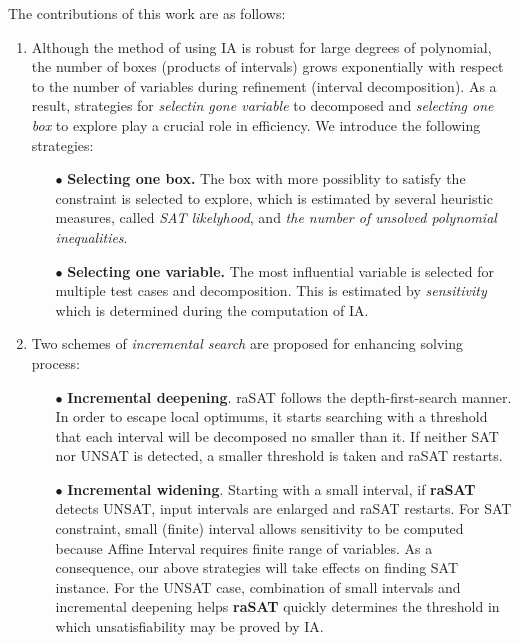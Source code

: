 The contributions of this work are as follows:
\begin{enumerate}
\item Although the method of using IA is robust for large degrees of polynomial, the number of boxes (products of intervals) grows exponentially with respect to the number of variables during refinement (interval decomposition). As a result, strategies for \emph{selectin gone variable} to decomposed and \emph{selecting one box} to explore play a crucial role in efficiency. We introduce the following strategies:
\begin{itemize}
\item[$\bullet$] \textbf{Selecting one box.} The box with more possiblity to satisfy the constraint is selected to explore, which is estimated by 
several heuristic measures, called {\em SAT likelyhood}, 
and \emph{the number of unsolved polynomial inequalities}.
\item[$\bullet$] \textbf{Selecting one variable.} The most influential variable is selected for multiple test cases and decomposition. 
This is estimated by {\em sensitivity} which is determined during the computation of IA.
\end{itemize}
\item Two schemes of \emph{incremental search} are proposed for enhancing solving process: 
\begin{itemize} 
\item[$\bullet$] {\bf Incremental deepening}. 
raSAT follows the depth-first-search manner. In order to escape local optimums, it starts searching with a threshold that each interval will be decomposed no smaller than it. 
If neither SAT nor UNSAT is detected, a smaller threshold is taken and raSAT restarts. 
\item[$\bullet$] {\bf Incremental widening}. 
Starting with a small interval, if \textbf{raSAT} detects UNSAT, input intervals are enlarged
and raSAT restarts. For SAT constraint, small (finite) interval allows sensitivity to be computed because Affine Interval \cite{VanKhanh201227} requires finite range of variables. As a consequence, our above strategies will take effects on finding SAT instance. For the UNSAT case, combination of small intervals and incremental deepening helps \textbf{raSAT} quickly determines the threshold in which unsatisfiability may be proved by IA. 
\end{itemize} 
\begin{comment}
SAT-likelihood is introduced to measure the possibility of an inequality to be satisfiable. Sensitivity is proposed to estimate the influence of a variable to the value of a polynomial.

\end{comment}
\end{enumerate}
